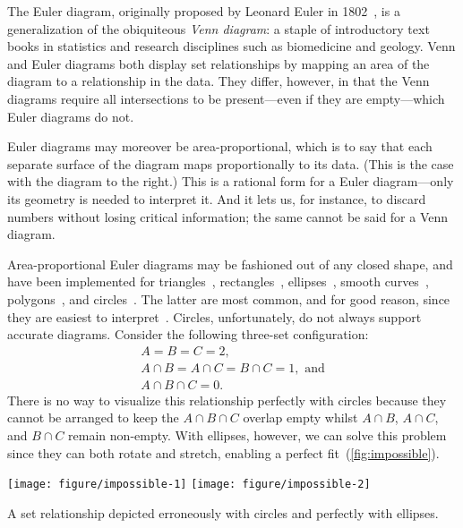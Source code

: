 \documentclass[
  oneside,
  openany,
  numbers=noendperiod,
  parskip=half,
  bibliography=totoc
]{scrbook}\usepackage[]{graphicx}\usepackage{xcolor}
\newenvironment{knitrout}{}{} %
\begin{document}
The Euler diagram, originally proposed by Leonard Euler in
1802~\citep{Euler_1802}, is
a generalization of the obiquiteous \emph{Venn diagram}:
a staple of introductory
text books in statistics and research disciplines such as biomedicine and
geology. Venn and Euler diagrams both display
set relationships by mapping an area of the diagram to a relationship in
the data. They differ, however,
in that the Venn diagrams require all
intersections to be present---even if they are empty---which Euler diagrams do
not.

Euler diagrams may moreover be area-proportional, which is to say that each separate
surface of the diagram maps proportionally to its data. (This is the case with
the diagram to the right.) This is a rational form for a
Euler diagram---only its geometry is needed to interpret it. And it lets us, for
instance, to discard numbers without losing critical information; the same
cannot be said for a Venn diagram.

Area-proportional Euler diagrams may be fashioned out of any closed shape, and
have been implemented for triangles~\citep{Swinton_2011},
rectangles~\citep{Swinton_2011}, ellipses~\citep{Micallef_2014a}, smooth
curves~\citep{Micallef_2014}, polygons~\citep{Swinton_2011}, and
circles~\citep{Wilkinson_2012,Kestler_2008,Swinton_2011}. The latter are
most common, and for good reason, since they are easiest to
interpret~\citep{Blake_2016}. Circles, unfortunately, do not always support
accurate diagrams. Consider the following
three-set configuration:
\[
\begin{gathered}
A = B = C = 2,\\
A \cap B = A \cap C = B \cap C = 1,\text{ and}\\
A \cap B \cap C = 0.
\end{gathered}
\]
There is no way to visualize this relationship perfectly with circles because
they cannot be arranged to keep the $A \cap B \cap C$ overlap empty whilst
$A \cap B$, $A \cap C$, and $B \cap C$ remain non-empty. With ellipses, however,
we can solve this problem since they can both rotate and stretch, enabling
a perfect fit~(\cref{fig:impossible}).

\begin{marginfigure}
\begin{knitrout}\small
{}\color{fgcolor}

{\centering \texttt{[image: figure/impossible-1]} 
\texttt{[image: figure/impossible-2]} 

}



\end{knitrout}
\caption{A set relationship depicted erroneously with circles and perfectly with
ellipses.}
\label{fig:impossible}
\end{marginfigure}
\end{document}
